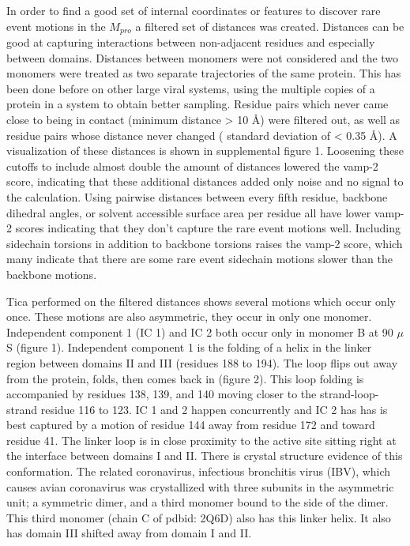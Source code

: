 \documentclass{biophys-new}
\begin{document}
In order to find a good set of internal coordinates or features to discover rare event motions in the $M_{pro}$ a filtered set of distances was created. Distances can be good at capturing interactions between non-adjacent residues and especially between domains. Distances between monomers were not considered and the two monomers were treated as two separate trajectories of the same protein. This has been done before on other large viral systems, using the multiple copies of a protein in a system to obtain better sampling.\cite{perilla2017physical, hadden2018all} Residue pairs which never came close to being in contact (minimum distance > 10 Å) were filtered out, as well as residue pairs whose distance never changed ( standard deviation of < 0.35 Å). A visualization of these distances is shown in supplemental figure 1. Loosening these cutoffs to include almost double the amount of distances lowered the vamp-2 score, indicating that these additional distances added only noise and no signal to the calculation. Using pairwise distances between every fifth residue, backbone dihedral angles, or solvent accessible surface area per residue all have lower vamp-2 scores indicating that they don't capture the rare event motions well. Including sidechain torsions in addition to backbone torsions raises the vamp-2 score, which many indicate that there are some rare event sidechain motions slower than the backbone motions.

Tica performed on the filtered distances shows several motions which occur only once. These motions are also asymmetric, they occur in only one monomer. Independent component 1 (IC 1) and IC 2 both occur only in monomer B at 90 $\mu$S (figure 1). Independent component 1 is the folding of a helix in the linker region between domains II and III (residues 188 to 194). The loop flips out away from the protein, folds, then comes back in (figure 2). This loop folding is accompanied by residues 138, 139, and 140 moving closer to the strand-loop-strand residue 116 to 123. IC 1 and 2 happen concurrently and IC 2 has has is best captured by a motion of residue 144 away from residue 172 and toward residue 41. The linker loop is in close proximity to the active site sitting right at the interface between domains I and II. There is crystal structure evidence of this conformation. The related coronavirus, infectious bronchitis virus (IBV), which causes avian coronavirus was crystallized with three subunits in the asymmetric unit; a symmetric dimer, and a third monomer bound to the side of the dimer. This third monomer (chain C of pdbid: 2Q6D) also has this linker helix. It also has domain III shifted away from domain I and II.
\end{document}
